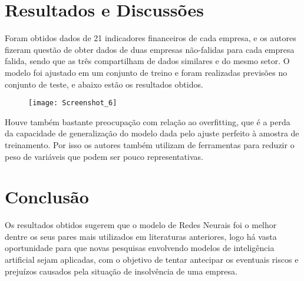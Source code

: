 \documentclass[12pt, a4paper]{article}
\begin{document}
\section{Resultados e Discussões}

Foram obtidos dados de 21 indicadores financeiros de cada empresa, e os autores fizeram questão de obter dados de duas empresas não-falidas para cada empresa falida, sendo que as três compartilham de dados similares e do mesmo setor. O modelo foi ajustado em um conjunto de treino e foram realizadas previsões no conjunto de teste, e abaixo estão os resultados obtidos.

\begin{figure}[h]
    \centering
    \texttt{[image: Screenshot\_6]} %
    \label{script} %
\end{figure}

Houve também bastante preocupação com relação ao overfitting, que é a perda da capacidade de generalização do modelo dada pelo ajuste perfeito à amostra de treinamento. Por isso os autores também utilizam de ferramentas para reduzir o peso de variáveis que podem ser pouco representativas.

\section{Conclusão}

Os resultados obtidos sugerem que o modelo de Redes Neurais foi o melhor dentre os seus pares mais utilizados em literaturas anteriores, logo há vasta oportunidade para que novas pesquisas envolvendo modelos de inteligência artificial sejam aplicadas, com o objetivo de tentar antecipar os eventuais riscos e prejuízos causados pela situação de insolvência de uma empresa.
\end{document}
